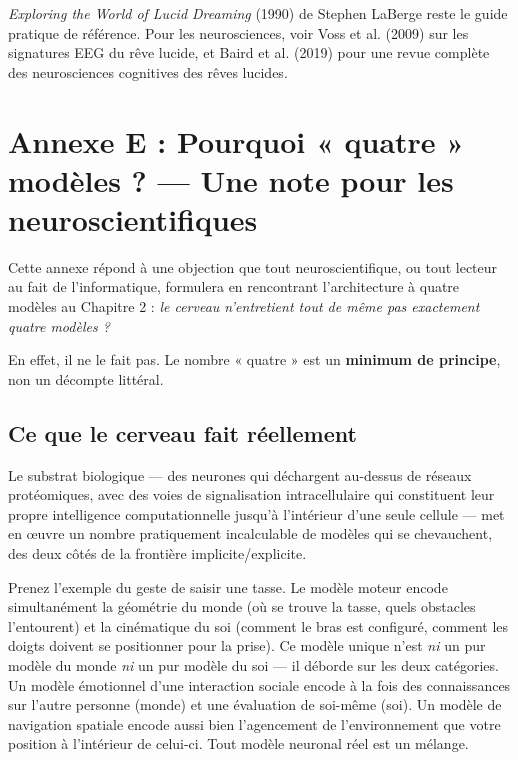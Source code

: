 \documentclass[11pt, twoside, openright]{book}
\begin{document}
\textit{Exploring the World of Lucid Dreaming} (1990) de Stephen LaBerge reste le guide pratique de référence. Pour les neurosciences, voir Voss et al. (2009) sur les signatures EEG du rêve lucide, et Baird et al. (2019) pour une revue complète des neurosciences cognitives des rêves lucides.


\chapter*{Annexe E : Pourquoi « quatre » modèles ? --- Une note pour les neuroscientifiques}

Cette annexe répond à une objection que tout neuroscientifique, ou tout lecteur au fait de l'informatique, formulera en rencontrant l'architecture à quatre modèles au Chapitre 2 : \textit{le cerveau n'entretient tout de même pas exactement quatre modèles ?}

En effet, il ne le fait pas. Le nombre « quatre » est un \textbf{minimum de principe}, non un décompte littéral.

\section*{Ce que le cerveau fait réellement}

Le substrat biologique --- des neurones qui déchargent au-dessus de réseaux protéomiques, avec des voies de signalisation intracellulaire qui constituent leur propre intelligence computationnelle jusqu'à l'intérieur d'une seule cellule --- met en œuvre un nombre pratiquement incalculable de modèles qui se chevauchent, des deux côtés de la frontière implicite/\allowbreak{}explicite.

Prenez l'exemple du geste de saisir une tasse. Le modèle moteur encode simultanément la géométrie du monde (où se trouve la tasse, quels obstacles l'entourent) et la cinématique du soi (comment le bras est configuré, comment les doigts doivent se positionner pour la prise). Ce modèle unique n'est \textit{ni} un pur modèle du monde \textit{ni} un pur modèle du soi --- il déborde sur les deux catégories. Un modèle émotionnel d'une interaction sociale encode à la fois des connaissances sur l'autre personne (monde) et une évaluation de soi-même (soi). Un modèle de navigation spatiale encode aussi bien l'agencement de l'environnement que votre position à l'intérieur de celui-ci. Tout modèle neuronal réel est un mélange.
\end{document}
